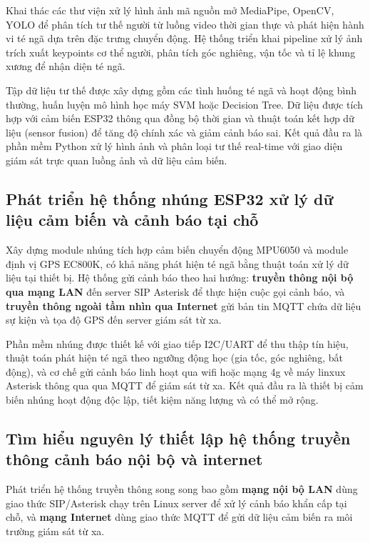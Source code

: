 Khai thác các thư viện xử lý hình ảnh mã nguồn mở MediaPipe, OpenCV, YOLO để phân tích tư thế người từ luồng video thời gian thực và phát hiện hành vi té ngã dựa trên đặc trưng chuyển động. Hệ thống triển khai pipeline xử lý ảnh trích xuất keypoints cơ thể người, phân tích góc nghiêng, vận tốc và tỉ lệ khung xương để nhận diện té ngã.

Tập dữ liệu tư thế được xây dựng gồm các tình huống té ngã và hoạt động bình thường, huấn luyện mô hình học máy SVM hoặc Decision Tree. Dữ liệu được tích hợp với cảm biến ESP32 thông qua đồng bộ thời gian và thuật toán kết hợp dữ liệu (sensor fusion) để tăng độ chính xác và giảm cảnh báo sai. Kết quả đầu ra là phần mềm Python xử lý hình ảnh và phân loại tư thế real-time với giao diện giám sát trực quan luồng ảnh và dữ liệu cảm biến.

\subsection{Phát triển hệ thống nhúng ESP32 xử lý dữ liệu cảm biến và cảnh báo tại chỗ}

Xây dựng module nhúng tích hợp cảm biến chuyển động MPU6050 và module định vị GPS EC800K, có khả năng phát hiện té ngã bằng thuật toán xử lý dữ liệu tại thiết bị. Hệ thống gửi cảnh báo theo hai hướng: \textbf{truyền thông nội bộ qua mạng LAN} đến server SIP Asterisk để thực hiện cuộc gọi cảnh báo, và \textbf{truyền thông ngoài tầm nhìn qua Internet} gửi bản tin MQTT chứa dữ liệu sự kiện và tọa độ GPS đến server giám sát từ xa.

Phần mềm nhúng được thiết kế với giao tiếp I2C/UART để thu thập tín hiệu, thuật toán phát hiện té ngã theo ngưỡng động học (gia tốc, góc nghiêng, bất động), và cơ chế gửi cảnh báo linh hoạt qua wifi hoặc mạng 4g về máy linxux Asterisk thông qua qua MQTT để giám sát từ xa. Kết quả đầu ra là thiết bị cảm biến nhúng hoạt động độc lập, tiết kiệm năng lượng và có thể mở rộng.

\subsection{Tìm hiểu nguyên lý thiết lập hệ thống truyền thông cảnh báo nội bộ và internet }

Phát triển hệ thống truyền thông song song bao gồm \textbf{mạng nội bộ LAN} dùng giao thức SIP/Asterisk chạy trên Linux server để xử lý cảnh báo khẩn cấp tại chỗ, và \textbf{mạng Internet} dùng giao thức MQTT để gửi dữ liệu cảm biến ra môi trường giám sát từ xa.

